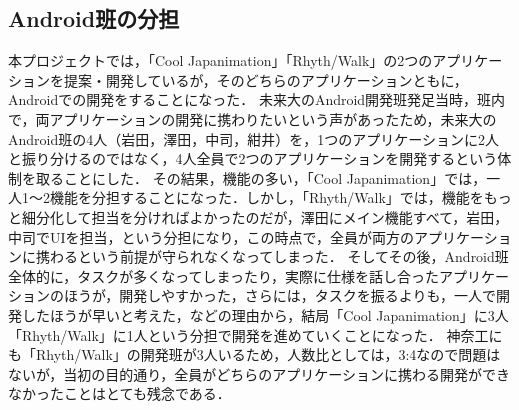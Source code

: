 \subsection{Android班の分担}
\par
本プロジェクトでは，「Cool Japanimation」「Rhyth/Walk」の2つのアプリケーションを提案・開発しているが，そのどちらのアプリケーションともに，Androidでの開発をすることになった．
未来大のAndroid開発班発足当時，班内で，両アプリケーションの開発に携わりたいという声があったため，未来大のAndroid班の4人（岩田，澤田，中司，紺井）を，1つのアプリケーションに2人と振り分けるのではなく，4人全員で2つのアプリケーションを開発するという体制を取ることにした．
その結果，機能の多い，「Cool Japanimation」では，一人1～2機能を分担することになった．しかし，「Rhyth/Walk」では，機能をもっと細分化して担当を分ければよかったのだが，澤田にメイン機能すべて，岩田，中司でUIを担当，という分担になり，この時点で，全員が両方のアプリケーションに携わるという前提が守られなくなってしまった．
そしてその後，Android班全体的に，タスクが多くなってしまったり，実際に仕様を話し合ったアプリケーションのほうが，開発しやすかった，さらには，タスクを振るよりも，一人で開発したほうが早いと考えた，などの理由から，結局「Cool Japanimation」に3人「Rhyth/Walk」に1人という分担で開発を進めていくことになった．
神奈工にも「Rhyth/Walk」の開発班が3人いるため，人数比としては，3:4なので問題はないが，当初の目的通り，全員がどちらのアプリケーションに携わる開発ができなかったことはとても残念である．
